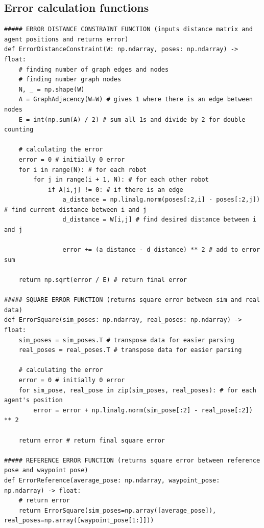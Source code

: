 \documentclass[11pt]{article}
\begin{document}
\subsection{Error calculation functions}
\begin{verbatim}
##### ERROR DISTANCE CONSTRAINT FUNCTION (inputs distance matrix and agent positions and returns error)
def ErrorDistanceConstraint(W: np.ndarray, poses: np.ndarray) -> float:
    # finding number of graph edges and nodes
    # finding number graph nodes
    N, _ = np.shape(W)
    A = GraphAdjacency(W=W) # gives 1 where there is an edge between nodes
    E = int(np.sum(A) / 2) # sum all 1s and divide by 2 for double counting

    # calculating the error
    error = 0 # initially 0 error
    for i in range(N): # for each robot 
        for j in range(i + 1, N): # for each other robot
            if A[i,j] != 0: # if there is an edge
                a_distance = np.linalg.norm(poses[:2,i] - poses[:2,j]) # find current distance between i and j
                d_distance = W[i,j] # find desired distance between i and j

                error += (a_distance - d_distance) ** 2 # add to error sum

    return np.sqrt(error / E) # return final error

##### SQUARE ERROR FUNCTION (returns square error between sim and real data)
def ErrorSquare(sim_poses: np.ndarray, real_poses: np.ndarray) -> float:
    sim_poses = sim_poses.T # transpose data for easier parsing
    real_poses = real_poses.T # transpose data for easier parsing

    # calculating the error
    error = 0 # initially 0 error
    for sim_pose, real_pose in zip(sim_poses, real_poses): # for each agent's position
        error = error + np.linalg.norm(sim_pose[:2] - real_pose[:2]) ** 2

    return error # return final square error

##### REFERENCE ERROR FUNCTION (returns square error between reference pose and waypoint pose)
def ErrorReference(average_pose: np.ndarray, waypoint_pose: np.ndarray) -> float:
    # return error
    return ErrorSquare(sim_poses=np.array([average_pose]), real_poses=np.array([waypoint_pose[1:]]))
\end{verbatim}

\clearpage
\end{document}
